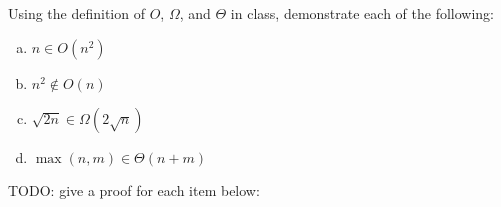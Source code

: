 

Using the definition of $O$, $\Omega$, and $\Theta$ in class, demonstrate each of the following:

\begin{enumerate}[a.]
    \item $n \in O(n^2)$
    \item $n^2 \notin O(n)$
    \item $\sqrt{2n} \in \Omega(2\sqrt{n})$
    \item $\max(n,m)\in \Theta(n+m)$
\end{enumerate}

TODO: give a proof for each item below:



